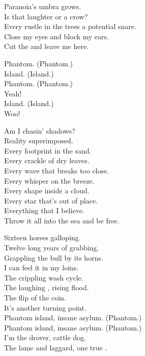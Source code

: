 Paranoia's umbra grows. \\
Is that laughter or a crow? \\
Every rustle in the trees a potential snare. \\
Close my eyes and block my ears. \\
Cut the  and leave me here. \\


Phantom. (Phantom.) \\
Island. (Island.) \\
Phantom. (Phantom.) \\
Yeah! \\
Island. (Island.) \\
Woo! \\


Am I chasin' shadows? \\
Reality superimposed. \\
Every footprint in the sand. \\
Every crackle of dry leaves. \\
Every wave that breaks too close. \\
Every whisper on the breeze. \\
Every shape inside a cloud. \\
Every star that's out of place. \\
Everything that I believe. \\
Throw it all into the sea and be free. \\


Sixteen horses galloping. \\
Twelve long years of grabbing. \\
Grappling the bull by its horns. \\
I can feel it in my loins. \\
The crippling  wash cycle. \\
The laughing , rising flood. \\
The flip of the coin. \\
It's another turning point. \\

Phantom island, insane asylum. (Phantom.) \\
Phantom island, insane asylum. (Phantom.) \\
I'm the drover, cattle dog. \\
The lame and laggard, one true . \\

